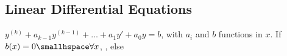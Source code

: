 \newsectionNoPB
\subsection{Linear Differential Equations}
$y^{(k)} + a_{k - 1}y^{(k - 1)} + \ldots + a_1 y' + a_0 y = b$, with $a_i$ and $b$ functions in $x$. 
If $b(x) = 0 \smallhspace \forall x$, , else 
